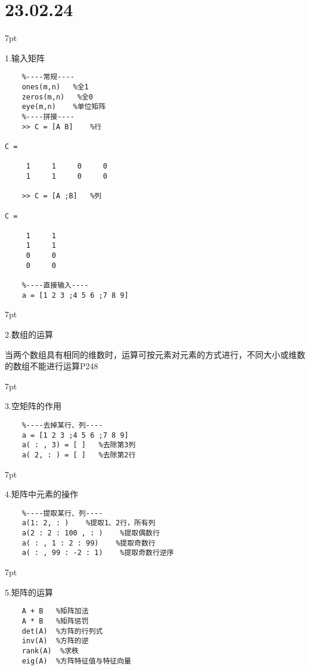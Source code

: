 \documentclass{article} %
\newenvironment{eg}{%
\def\FrameCommand{%
\hspace{1pt}%
{\color{Gray}\vrule width 2pt}%
{\color{egshade}\vrule width 4pt}%
\colorbox{egshade}%
}%
\MakeFramed{\advance\hsize-\width\FrameRestore}%
\noindent\hspace{-4.55pt}%
\begin{adjustwidth}{}{7pt}%
\vspace{2pt}\vspace{2pt}%
\normalfont %
}
{%
\vspace{2pt}\end{adjustwidth}\endMakeFramed%
}
\begin{document}
\noindent \Large \section*{23.02.24} \par \normalsize
\begin{eg}
    1.输入矩阵
\end{eg}
\begin{lstlisting}
    %----常规----
    ones(m,n)   %全1
    zeros(m,n)   %全0
    eye(m,n)    %单位矩阵
    %----拼接----
    >> C = [A B]    %行

C =

     1     1     0     0
     1     1     0     0

    >> C = [A ;B]   %列
 
C =

     1     1
     1     1
     0     0
     0     0

    %----直接输入----
    a = [1 2 3 ;4 5 6 ;7 8 9]
\end{lstlisting}

\begin{eg}
    2.数组的运算

    当两个数组具有相同的维数时，运算可按元素对元素的方式进行，不同大小或维数的数组不能进行运算P248
\end{eg}

\begin{eg}
    3.空矩阵的作用
\end{eg}
\begin{lstlisting}
    %----去掉某行、列----
    a = [1 2 3 ;4 5 6 ;7 8 9]
    a( : , 3) = [ ]   %去除第3列
    a( 2, : ) = [ ]   %去除第2行  
\end{lstlisting}

\begin{eg}
    4.矩阵中元素的操作
\end{eg}
\begin{lstlisting}
    %----提取某行、列----
    a(1: 2, : )    %提取1、2行，所有列
    a(2 : 2 : 100 , : )    %提取偶数行
    a( : , 1 : 2 : 99)    %提取奇数行
    a( : , 99 : -2 : 1)    %提取奇数行逆序
\end{lstlisting}

\begin{eg}
    5.矩阵的运算
\end{eg}
\begin{lstlisting}
    A + B   %矩阵加法
    A * B   %矩阵惩罚
    det(A)  %方阵的行列式
    inv(A)  %方阵的逆
    rank(A)  %求秩
    eig(A)  %方阵特征值与特征向量
\end{lstlisting}
\end{document}
